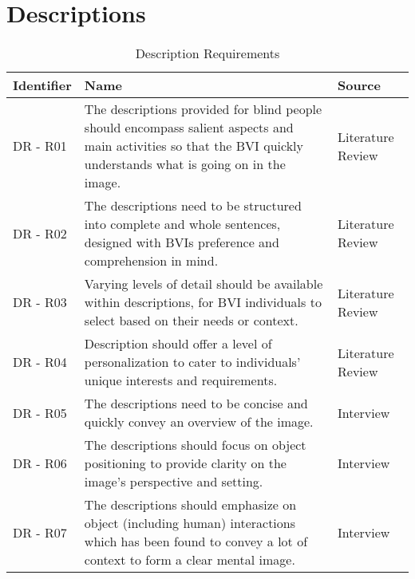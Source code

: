 \section{Descriptions}

\begin{table}[ht]
  \centering
  \caption{Description Requirements}
    \begin{tabularx}{\textwidth}{@{}p{2cm}p{10cm}p{3cm}@{}}
    \toprule
    \textbf{Identifier} & \textbf{Name} & \textbf{Source}\\
    \midrule
    DR - R01 & The descriptions provided for blind people should encompass salient aspects and main activities so that the BVI quickly understands what is going on in the image. & Literature Review\\
    \hline
    DR - R02 & The descriptions need to be structured into complete and whole sentences, designed with BVIs preference and comprehension in mind. & Literature Review\\
    \hline
    DR - R03 & Varying levels of detail should be available within descriptions, for BVI individuals to select based on their needs or context. & Literature Review\\
    \hline
    DR - R04 & Description should offer a level of personalization to cater to individuals' unique interests and requirements. & Literature Review\\
    \hline
    DR - R05 & The descriptions need to be concise and quickly convey an overview of the image. & Interview\\
    \hline
    DR - R06 & The descriptions should focus on object positioning to provide clarity on the image's perspective and setting. & Interview\\
    \hline
    DR - R07 & The descriptions should emphasize on object (including human) interactions which has been found to convey a lot of context to form a clear mental image. & Interview\\
    \hline

    \bottomrule
  \end{tabularx}
  \label{tab:requirements}
\end{table}

